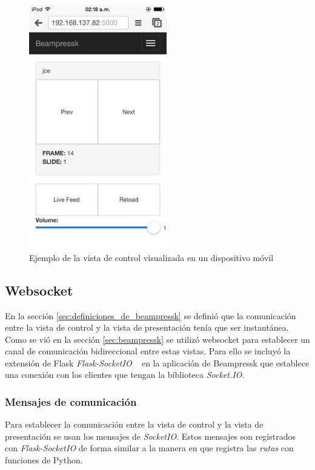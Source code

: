 			\begin{figure}[tb]
				\centering
				\includegraphics[width=6cm]{img/control}
				\caption{Ejemplo de la vista de control visualizada en un dispositivo móvil}
				\label{fig:control}
			\end{figure}						

		\subsection{Websocket} %
		\label{sub:websocket}

		En la sección \ref{sec:definiciones_de_beampressk} se definió que la comunicación entre la vista de control y la vista de presentación tenía que ser instantánea. Como se vió en la sección \ref{sec:beampressk} se utilizó websocket para establecer un canal de comunicación bidireccional entre estas vistas. Para ello se incluyó la extensión de Flask \textit{Flask-SocketIO} ~\cite{flasksocket} en la aplicación de Beampressk que establece una conexión con los clientes que tengan la biblioteca \textit{Socket.IO}.

			\subsubsection{Mensajes de comunicación} %
			\label{ssub:mensajes_de_comunicacion}
				Para establecer la comunicación entre la vista de control y la vista de presentación se usan los mensajes de \textit{SocketIO}. Estos mensajes son registrados con \textit{Flask-SocketIO} de forma similar a la manera en que registra las \textit{rutas} con funciones de Python. 

